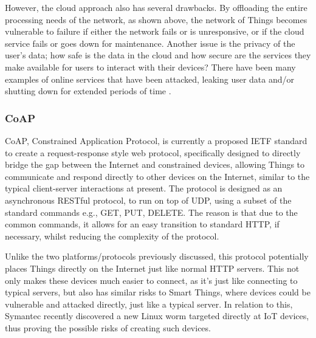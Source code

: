 However, the cloud approach also has several drawbacks. By offloading the entire processing needs of the network, as shown above, the network of Things becomes vulnerable to failure if either the network fails or is unresponsive, or if the cloud service fails or goes down for maintenance. Another issue is the privacy of the user's data; how safe is the data in the cloud and how secure are the services they make available for users to interact with their devices? There have been many examples of online services that have been attacked, leaking user data and/or shutting down for extended periods of time \cite{Playstation, Amazon, Google}.

\subsubsection{CoAP} %
\label{ssub:core_coap}
CoAP, Constrained Application Protocol\cite{IETF_COAP_HTTP}, is currently a proposed IETF standard to create a request-response style web protocol, specifically designed to directly bridge the gap between the Internet and constrained devices, allowing Things to communicate and respond directly to other devices on the Internet, similar to the typical client-server interactions at present. The protocol is designed as an asynchronous RESTful protocol, to run on top of UDP, using a subset of the standard commands e.g., GET, PUT, DELETE. The reason is that due to the common commands, it allows for an easy transition to standard HTTP, if necessary, whilst reducing the complexity of the protocol.

Unlike the two platforms/protocols previously discussed, this protocol potentially places Things directly on the Internet just like normal HTTP servers. This not only makes these devices much easier to connect, as it's just like connecting to typical servers, but also has similar risks to Smart Things, where devices could be vulnerable and attacked directly, just like a typical server. In relation to this, Symantec recently discovered a new Linux worm\cite{IoTWorm} targeted directly at IoT devices, thus proving the possible risks of creating such devices.




